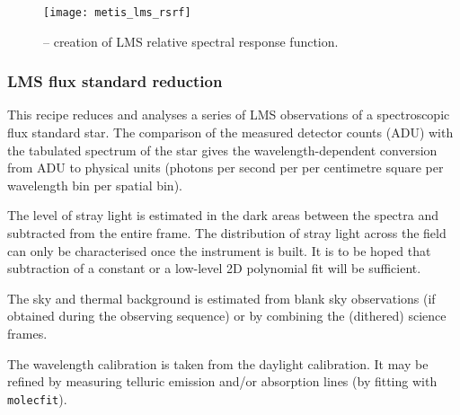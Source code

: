 \begin{figure}[hb]
  \centering
  \texttt{[image: metis\_lms\_rsrf]}
  \caption[Recipe: ]{ --
    creation of LMS relative spectral response function.}
  \label{fig:metis_lms_rsrf}
\end{figure}


\clearpage
\subsubsection{LMS flux standard reduction}
\label{sssec:lms_std_process}

This recipe reduces and analyses a series of LMS observations of a
spectroscopic flux standard star. The comparison of the measured
detector counts (ADU) with the tabulated spectrum of the star gives
the wavelength-dependent conversion from ADU to physical units
(photons per second per per centimetre square per wavelength bin per
spatial bin).

The level of stray light is estimated in the dark areas between the
spectra and subtracted from the entire frame. The distribution of
stray light across the field can only be characterised once the
instrument is built. It is to be hoped that subtraction of a constant
or a low-level 2D polynomial fit will be sufficient.

The sky and thermal background is estimated from blank sky
observations (if obtained during the observing sequence) or by
combining the (dithered) science frames.

The wavelength calibration is taken from the daylight calibration. It
may be refined by measuring telluric emission and/or absorption lines
(by fitting with \lstinline{molecfit}).

